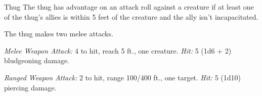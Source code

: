\documentclass[10pt,a4paper,twoside,bg=print,twocolumn,openany,nodeprecatedcode]{dndbook}
\begin{document}
\begin{DndMonster}[float=t]{Thug}
\DndMonsterBasics[
armor-class = {11 (\textit{leather armor})},
hit-points = {\DndDice{5d8 + 10}},
speed = {30 ft.}
]
\DndMonsterAbilityScores[
 str = 15,
 dex = 11,
 con = 14,
 int = 10,
 wis = 10,
 cha = 11
]
\DndMonsterDetails[
skills = {Intimidation +2},
languages = {any one language (usually Common)},
challenge = 1/2,
]
The thug has advantage on an attack roll against a creature if at least one of the thug's allies is within 5 feet of the creature and the ally isn't incapacitated.

The thug makes two melee attacks.

\textsl{Melee Weapon Attack:} 4 to hit, reach 5 ft., one creature. \textsl{Hit:} 5 (1d6 + 2) bludgeoning damage.

\textsl{Ranged Weapon Attack:} 2 to hit, range 100/400 ft., one target. \textsl{Hit:} 5 (1d10) piercing damage.

\end{DndMonster}
\end{document}
